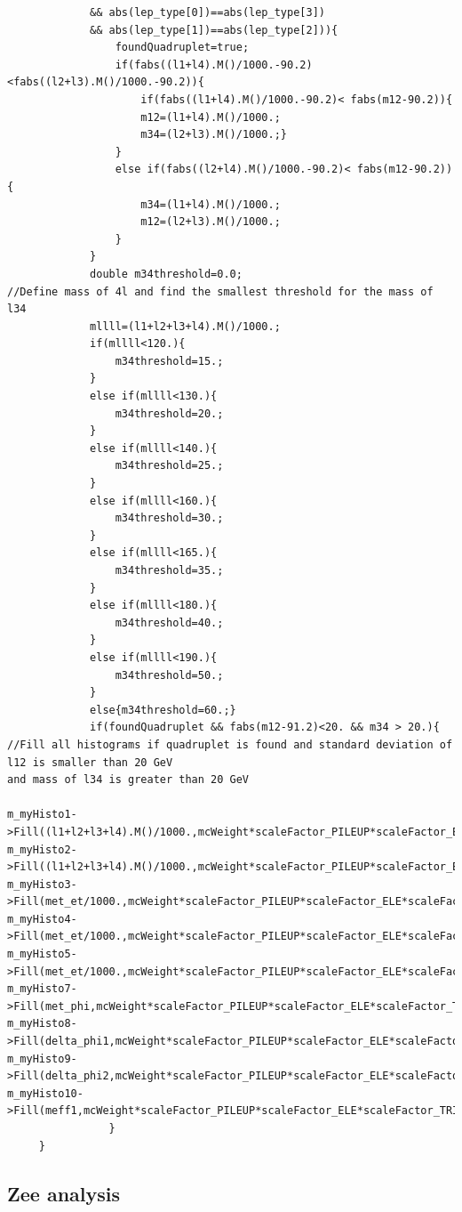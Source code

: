 \documentclass[runningheads,a4paper]{llncs}
\begin{document}
\begin{verbatim}
             && abs(lep_type[0])==abs(lep_type[3]) 
             && abs(lep_type[1])==abs(lep_type[2])){
   				 foundQuadruplet=true;
   				 if(fabs((l1+l4).M()/1000.-90.2)<fabs((l2+l3).M()/1000.-90.2)){
   					 if(fabs((l1+l4).M()/1000.-90.2)< fabs(m12-90.2)){
   					 m12=(l1+l4).M()/1000.;
   					 m34=(l2+l3).M()/1000.;}
   				 }
   				 else if(fabs((l2+l4).M()/1000.-90.2)< fabs(m12-90.2)){
   					 m34=(l1+l4).M()/1000.;
   					 m12=(l2+l3).M()/1000.;
   				 } 
   			 }
   			 double m34threshold=0.0;
//Define mass of 4l and find the smallest threshold for the mass of l34
   			 mllll=(l1+l2+l3+l4).M()/1000.;
   			 if(mllll<120.){
   				 m34threshold=15.;
   			 }
   			 else if(mllll<130.){
   				 m34threshold=20.;
   			 }
   			 else if(mllll<140.){
   				 m34threshold=25.;
   			 }
   			 else if(mllll<160.){
   				 m34threshold=30.;
   			 }
   			 else if(mllll<165.){
   				 m34threshold=35.;
   			 }
   			 else if(mllll<180.){
   				 m34threshold=40.;
   			 }
   			 else if(mllll<190.){
   				 m34threshold=50.;
   			 }
   			 else{m34threshold=60.;}
   			 if(foundQuadruplet && fabs(m12-91.2)<20. && m34 > 20.){
//Fill all histograms if quadruplet is found and standard deviation of l12 is smaller than 20 GeV 
and mass of l34 is greater than 20 GeV

m_myHisto1->Fill((l1+l2+l3+l4).M()/1000.,mcWeight*scaleFactor_PILEUP*scaleFactor_ELE*scaleFactor_TRIGGER*scaleFactor_MUON);
m_myHisto2->Fill((l1+l2+l3+l4).M()/1000.,mcWeight*scaleFactor_PILEUP*scaleFactor_ELE*scaleFactor_TRIGGER*scaleFactor_MUON);
m_myHisto3->Fill(met_et/1000.,mcWeight*scaleFactor_PILEUP*scaleFactor_ELE*scaleFactor_TRIGGER*scaleFactor_MUON); 
m_myHisto4->Fill(met_et/1000.,mcWeight*scaleFactor_PILEUP*scaleFactor_ELE*scaleFactor_TRIGGER*scaleFactor_MUON); 
m_myHisto5->Fill(met_et/1000.,mcWeight*scaleFactor_PILEUP*scaleFactor_ELE*scaleFactor_TRIGGER*scaleFactor_MUON); 
m_myHisto7->Fill(met_phi,mcWeight*scaleFactor_PILEUP*scaleFactor_ELE*scaleFactor_TRIGGER*scaleFactor_MUON);
m_myHisto8->Fill(delta_phi1,mcWeight*scaleFactor_PILEUP*scaleFactor_ELE*scaleFactor_TRIGGER*scaleFactor_MUON); 	
m_myHisto9->Fill(delta_phi2,mcWeight*scaleFactor_PILEUP*scaleFactor_ELE*scaleFactor_TRIGGER*scaleFactor_MUON);  	
m_myHisto10->Fill(meff1,mcWeight*scaleFactor_PILEUP*scaleFactor_ELE*scaleFactor_TRIGGER*scaleFactor_MUON);
			    }
   	 } 

\end{verbatim}
\subsection{Zee analysis}
\end{document}
